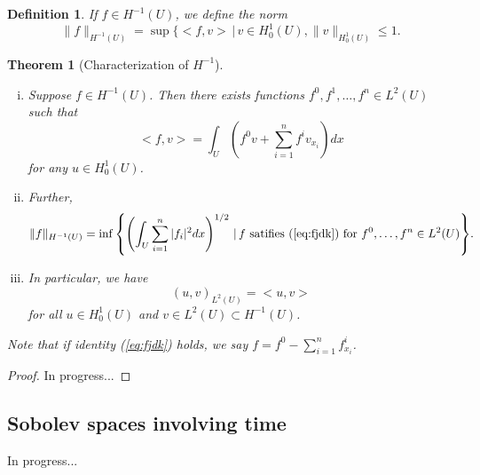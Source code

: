 \documentclass[11pt]{article}
\newtheorem{theorem}{Theorem}
\newtheorem{definition}{Definition}
\theoremstyle{definition}
\begin{document}
\begin{definition}
	If $f \in H^{-1}(U)$, we define the norm
	\begin{equation*}
		\|f\|_{H^{-1}(U)} = \sup{\{<f,v> \,|\, v\in H_0^1(U), \|v\|_{H_0^1(U)} \leq 1}.
	\end{equation*}
\end{definition}

\begin{theorem}[Characterization of $H^{-1}$]~ 
	\begin{enumerate}[(i)]
		\item Suppose $f\in H^{-1}(U)$. Then there exists functions $f^0,f^1,\dots,f^n \in L^2(U)$ such that
			\begin{equation}
				\label{eq:fjdk}
				<f,v> = \int_U \left(f^0v + \sum_{i=1}^n f^iv_{x_i}\right)dx
			\end{equation}
			for any $u \in H_0^1(U)$.
		\item Further,
			\begin{equation*}
				\|f\|_{H^{-1}(U)} = \inf{\left\{\left(\int_U \sum_{i=1}^n |f_i|^2dx\right)^{1/2} \,|\, f \text{ satifies } (\ref{eq:fjdk}) \text{ for } f^0,\dots,f^n \in L^2(U)\right\}}.
			\end{equation*}
		\item In particular, we have
			\begin{equation}
				(u,v)_{L^2(U)} = <u,v>
			\end{equation}
			for all $u \in H_0^1(U)$ and $v \in L^2(U) \subset H^{-1}(U)$.
	\end{enumerate}
	Note that if identity (\ref{eq:fjdk}) holds, we say $f = f^0 - \sum_{i=1}^n f_{x_i}^i$.
\end{theorem}
\begin{proof}
	In progress...
\end{proof}

\newpage

\subsection{Sobolev spaces involving time}
In progress...

\newpage
\end{document}
